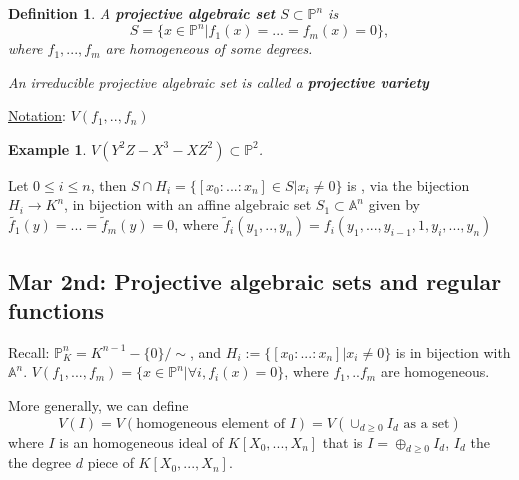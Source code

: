 \documentclass[11pt]{article}
\newtheorem{dfn}[thm]{Definition}
\newtheorem{ex}[thm]{Example}
\newcommand{\affn}{\mathbb A}
\newcommand{\proj}{\mathbb P}
\newcommand{\lrta}{\longrightarrow}
\begin{document}
\begin{dfn}
 A  \textbf{projective algebraic set} $S\subset \proj^n$ is 
 $$
  S=\{ x\in \proj^n|f_1(x)=...=f_m(x)=0\},
 $$
 where $f_1,...,f_m$ are homogeneous of some degrees.

 An irreducible projective algebraic set is called a \textbf{projective variety}
\end{dfn}

\underline{Notation}: $V(f_1,..,f_n)$

\begin{ex}
$V(Y^2 Z-X^3-X Z^2)\subset \proj^2$. 
\end{ex}
Let $0\leq i\leq n$, then $S\cap H_i=\{[x_0:...:x_n]\in S| x_i\neq 0\}$ is , via the bijection  $H_i\lrta K^n$, in bijection with an affine algebraic set $S_1\subset \affn^n$ given by $\tilde{f_1}(y)=...=\tilde{f}_m(y)=0$, where $\tilde{f}_i(y_1,..,y_n)=f_i(y_1,...,y_{i-1},1, y_i,...,y_n)$


\subsection{Mar 2nd: Projective algebraic sets and regular functions}
Recall: $\proj^n_K=K^{n-1}-\{0\}/\sim$, and $H_i:=\{[x_0:...:x_n]|x_i\neq 0\}$ is in bijection with $\affn^n$. $V(f_1,...,f_m)=\{x\in \proj^n|\forall i,f_i(x)=0\}$, where $f_1,..f_m$ are homogeneous.

More generally, we can define 
$$
V(I)=V(\text{homogeneous element of $I$})=V(\cup_{d\geq 0} I_d\text{ as a set})
$$
where $I$ is an homogeneous ideal of $K[X_0,...,X_n]$ that is  $I=\oplus_{d\geq 0} I_d$, $I_d$ the the degree $d$ piece of $K[X_0,...,X_n]$.
\end{document}
